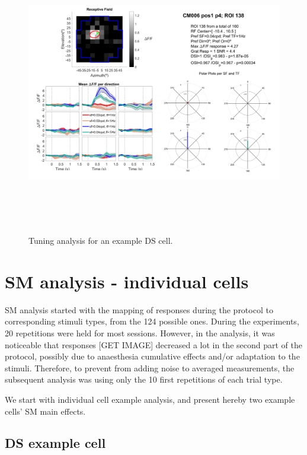 \begin{figure}[H] \centering \includegraphics[width=12.5cm,height=12.5cm,keepaspectratio]{Figures/7.Results/tuning/CM006_pos1_p4_ROI0138.png} 
\caption{Tuning analysis for an example DS cell.}
\label{tuninganalysisDS}
\end{figure}

\section{SM analysis - individual cells}

SM analysis started with the mapping of responses during the protocol to corresponding stimuli types, from the 124 possible ones. During the experiments, 20 repetitions were held for most sessions. However, in the analysis, it was noticeable that responses [GET IMAGE] decreased a lot in the second part of the protocol, possibly due to anaesthesia cumulative effects and/or adaptation to the stimuli. Therefore, to prevent from adding noise to averaged measurements, the subsequent analysis was using only the 10 first repetitions of each trial type.

We start with individual cell example analysis, and present hereby two example cells' SM main effects.

\subsection{DS example cell}
\label{DSexamplecell}

